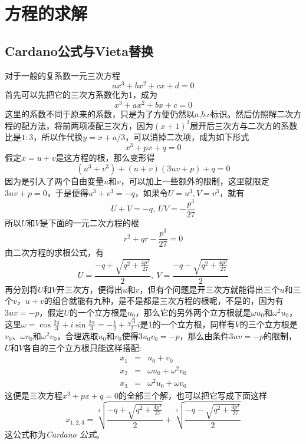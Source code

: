 
\section{方程的求解}
\label{sec:solve-high-equation}

\subsection{Cardano公式与Vieta替换}
\label{sec:solve-equation-with-3-degree}

对于一般的复系数一元三次方程
\begin{equation*}
  ax^3+bx^2+cx+d=0
\end{equation*}
首先可以先把它的三次方系数化为1，成为
\begin{equation*}
  x^3+ax^2+bx+c=0
\end{equation*}
这里的系数不同于原来的系数，只是为了方便仍然以$a$,$b$,$c$标识。然后仿照解二次方程的配方法，将前两项凑配三次方，因为$(x+1)^3$展开后三次方与二次方的系数比是$1:3$，所以作代换$y=x+a/3$，可以消掉二次项，成为如下形式
\begin{equation*}
  x^3+px+q=0
\end{equation*}
假定$x=u+v$是这方程的根，那么变形得
\begin{equation*}
  (u^3+v^3)+(u+v)(3uv+p)+q=0
\end{equation*}
因为是引入了两个自由变量$u$和$v$，可以加上一些额外的限制，这里就限定$3uv+p=0$，于是便得$u^3+v^3=-q$，如果令$U=u^3,V=v^3$，就有
\begin{equation*}
  U+V = -q, \  UV=-\frac{p^3}{27}
\end{equation*}
所以$U$和$V$是下面的一元二次方程的根
\begin{equation*}
  r^2+qr-\frac{p^3}{27} = 0
\end{equation*}
由二次方程的求根公式，有
\begin{equation*}
  U = \frac{-q+\sqrt{q^2+\frac{4p^3}{27}}}{2}, \  V = \frac{-q-\sqrt{q^2+\frac{4p^3}{27}}}{2}
\end{equation*}
再分别将$U$和$V$开三次方，便得出$u$和$v$，但有个问题是开三次方就能得出三个$u$和三个$v$，$u+v$的组合就能有九种，是不是都是三次方程的根呢，不是的，因为有$3uv=-p$，假定$U$的一个立方根是$u_0$，那么它的另外两个立方根就是$\omega u_0$和$\omega^2 u_0$，这里$\omega=\cos{\frac{2\pi}{3}}+i\sin{\frac{2\pi}{3}}=-\frac{1}{2}+\frac{\sqrt{3}}{2}i$是1的一个立方根，同样有$V$的三个立方根是$v_0$、$\omega v_0$和$\omega^2 v_0$，合理选取$u_0$和$v_0$使得$3u_0v_0=-p$，那么由条件$3uv=-p$的限制，$U$和$V$各自的三个立方根只能这样搭配:
\begin{eqnarray*}
  x_1 & = & u_0+v_0 \\
  x_2 & = & \omega u_0 + \omega^2 v_0 \\
  x_3 & = & \omega^2 u_0 + \omega v_0
\end{eqnarray*}
这便是三次方程$x^3+px+q=0$的全部三个解，也可以把它写成下面这样
\begin{equation}
  \label{eq:cardano-formula}
  x_{1,2,3} = \sqrt[3]{\frac{-q+\sqrt{q^2+\frac{4p^3}{27}}}{2}} + \sqrt[3]{\frac{-q-\sqrt{q^2+\frac{4p^3}{27}}}{2}}
\end{equation}
这公式称为\emph{Cardano 公式}。


